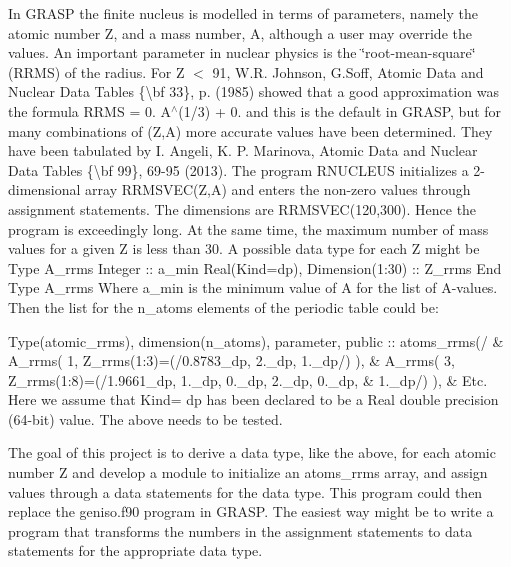 In {\ttfamily G\+R\+A\+SP} the finite nucleus is modelled in terms of parameters, namely the atomic number Z, and a mass number, A, although a user may override the values. An important parameter in nuclear physics is the \char`\"{}root-\/mean-\/square\char`\"{} (R\+R\+MS) of the radius. For Z $<$ 91, W.\+R. Johnson, G.\+Soff, Atomic Data and Nuclear Data Tables \{\textbackslash{}bf 33\}, p. (1985) showed that a good approximation was the formula {\ttfamily R\+R\+MS = 0. A$^\wedge$(1/3) + 0.} and this is the default in G\+R\+A\+SP, but for many combinations of (Z,A) more accurate values have been determined. They have been tabulated by I. Angeli, K. P. Marinova, Atomic Data and Nuclear Data Tables \{\textbackslash{}bf 99\}, 69-\/95 (2013). The program {\ttfamily R\+N\+U\+C\+L\+E\+US} initializes a 2-\/dimensional array R\+R\+M\+S\+V\+E\+C(\+Z,\+A) and enters the non-\/zero values through assignment statements. The dimensions are R\+R\+M\+S\+V\+E\+C(120,300). Hence the program is exceedingly long. At the same time, the maximum number of mass values for a given Z is less than 30. A possible data type for each Z might be Type A\+\_\+rrms Integer \+:: a\+\_\+min Real(Kind=dp), Dimension(1\+:30) \+:: Z\+\_\+rrms End Type A\+\_\+rrms Where a\+\_\+min is the minimum value of A for the list of A-\/values. Then the list for the n\+\_\+atoms elements of the periodic table could be\+:

Type(atomic\+\_\+rrms), dimension(n\+\_\+atoms), parameter, public \+:: atoms\+\_\+rrms(/ \& A\+\_\+rrms( 1, Z\+\_\+rrms(1\+:3)=(/0.8783\+\_\+dp, 2.\+\_\+dp, 1.\+\_\+dp/) ), \& A\+\_\+rrms( 3, Z\+\_\+rrms(1\+:8)=(/1.9661\+\_\+dp, 1.\+\_\+dp, 0.\+\_\+dp, 2.\+\_\+dp, 0.\+\_\+dp, \& 1.\+\_\+dp/) ), \& Etc. Here we assume that Kind= dp has been declared to be a Real double precision (64-\/bit) value. The above needs to be tested.

The goal of this project is to derive a data type, like the above, for each atomic number Z and develop a module to initialize an {\ttfamily atoms\+\_\+rrms} array, and assign values through a data statements for the data type. This program could then replace the {\ttfamily geniso.\+f90} program in G\+R\+A\+SP. The easiest way might be to write a program that transforms the numbers in the assignment statements to data statements for the appropriate data type. 